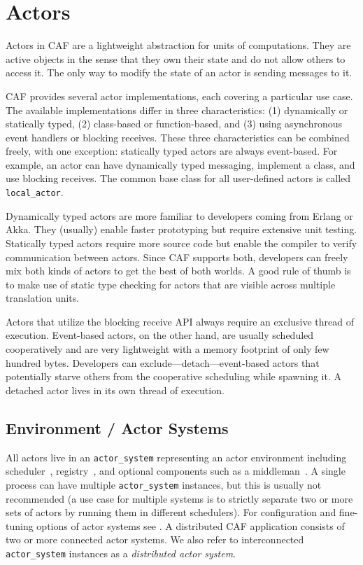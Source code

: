 \section{Actors}
\label{actor}

Actors in CAF are a lightweight abstraction for units of computations. They
are active objects in the sense that they own their state and do not allow
others to access it. The only way to modify the state of an actor is sending
messages to it.

CAF provides several actor implementations, each covering a particular use
case. The available implementations differ in three characteristics: (1)
dynamically or statically typed, (2) class-based or function-based, and (3)
using asynchronous event handlers or blocking receives. These three
characteristics can be combined freely, with one exception: statically typed
actors are always event-based. For example, an actor can have dynamically typed
messaging, implement a class, and use blocking receives. The common base class
for all user-defined actors is called \lstinline^local_actor^.

Dynamically typed actors are more familiar to developers coming from Erlang or
Akka. They (usually) enable faster prototyping but require extensive unit
testing. Statically typed actors require more source code but enable the
compiler to verify communication between actors. Since CAF supports both,
developers can freely mix both kinds of actors to get the best of both worlds.
A good rule of thumb is to make use of static type checking for actors that are
visible across multiple translation units.

Actors that utilize the blocking receive API always require an exclusive thread
of execution. Event-based actors, on the other hand, are usually scheduled
cooperatively and are very lightweight with a memory footprint of only few
hundred bytes. Developers can exclude---detach---event-based actors that
potentially starve others from the cooperative scheduling while spawning it. A
detached actor lives in its own thread of execution.

\subsection{Environment / Actor Systems}
\label{actor-system}

All actors live in an \lstinline^actor_system^ representing an actor
environment including scheduler~, registry~, and
optional components such as a middleman~. A single process can
have multiple \lstinline^actor_system^ instances, but this is usually not
recommended (a use case for multiple systems is to strictly separate two or
more sets of actors by running them in different schedulers). For configuration
and fine-tuning options of actor systems see . A
distributed CAF application consists of two or more connected actor systems. We
also refer to interconnected \lstinline^actor_system^ instances as a
\emph{distributed actor system}.

